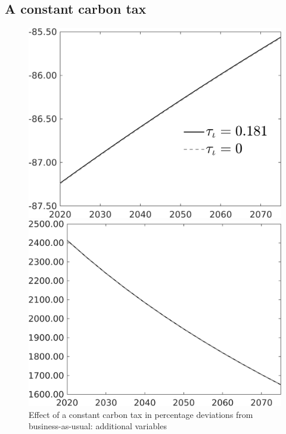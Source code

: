 

\subsection{A constant carbon tax}\label{app:polexp_cc}

\begin{figure}[h!!]
	\centering
	\caption{Effect of a constant carbon tax in percentage deviations from business-as-usual: additional variables }\label{fig:Leveltauf_nsk0_xgr0_add}
	\begin{minipage}[]{0.32\textwidth}
		\includegraphics[width=1\textwidth]{../../codding_model/own_basedOnFried/optimalPol_010922_revision/figures/all_13Sept22/PerdifNoTauf_regime5_CompTaul_sff_spillover0_nsk0_xgr0_knspil0_sep0_LFlimit0_emsbase0_countec0_GovRev0_etaa0.79_lgd1.png}
	\end{minipage}
	\begin{minipage}[]{0.32\textwidth}
		\includegraphics[width=1\textwidth]{../../codding_model/own_basedOnFried/optimalPol_010922_revision/figures/all_13Sept22/PerdifNoTauf_regime5_CompTaul_sg_spillover0_nsk0_xgr0_knspil0_sep0_LFlimit0_emsbase0_countec0_GovRev0_etaa0.79_lgd0.png}

\end{minipage}
\end{figure}

